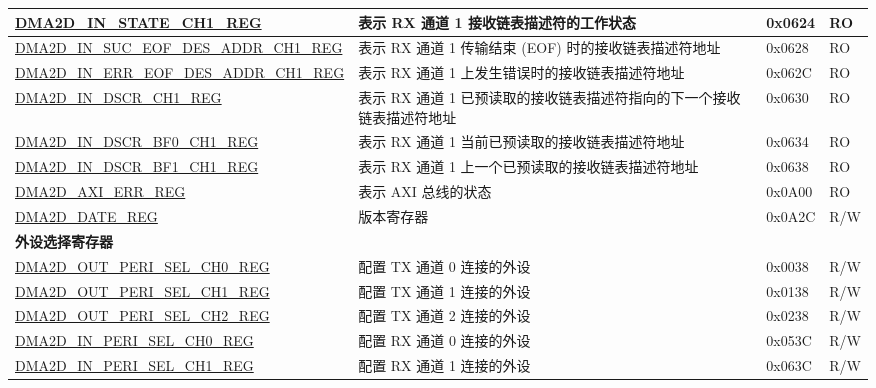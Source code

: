 \begin{longtable}{ | p{7cm} | p{11.5cm} | p{1.3cm} | p{2cm} | }
\hyperref[regdesc:DMA2DINSTATECHNREG]{DMA2D\_IN\_STATE\_CH1\_REG} & 表示 RX 通道 1 接收链表描述符的工作状态 & 0x0624 & RO \\ \hline
\hyperref[regdesc:DMA2DINSUCEOFDESADDRCHNREG]{DMA2D\_IN\_SUC\_EOF\_DES\_ADDR\_CH1\_REG} & 表示 RX 通道 1 传输结束 (EOF) 时的接收链表描述符地址 & 0x0628 & RO \\ \hline
\hyperref[regdesc:DMA2DINERREOFDESADDRCHNREG]{DMA2D\_IN\_ERR\_EOF\_DES\_ADDR\_CH1\_REG} & 表示 RX 通道 1 上发生错误时的接收链表描述符地址 & 0x062C & RO \\ \hline
\hyperref[regdesc:DMA2DINDSCRCHNREG]{DMA2D\_IN\_DSCR\_CH1\_REG} & 表示 RX 通道 1 已预读取的接收链表描述符指向的下一个接收链表描述符地址 & 0x0630 & RO \\ \hline
\hyperref[regdesc:DMA2DINDSCRBF0CHNREG]{DMA2D\_IN\_DSCR\_BF0\_CH1\_REG} & 表示 RX 通道 1 当前已预读取的接收链表描述符地址 & 0x0634 & RO \\ \hline
\hyperref[regdesc:DMA2DINDSCRBF1CHNREG]{DMA2D\_IN\_DSCR\_BF1\_CH1\_REG} & 表示 RX 通道 1 上一个已预读取的接收链表描述符地址 & 0x0638 & RO \\ \hline
\hyperref[regdesc:DMA2DAXIERRREG]{DMA2D\_AXI\_ERR\_REG} & 表示 AXI 总线的状态 & 0x0A00 & RO \\ \hline
\hyperref[regdesc:DMA2DDATEREG]{DMA2D\_DATE\_REG} & 版本寄存器 & 0x0A2C & R/W \\ \hline
\multicolumn{4}{|l|}{\textbf{外设选择寄存器}} \\ \hline
\hyperref[regdesc:DMA2DOUTPERISELCHNREG]{DMA2D\_OUT\_PERI\_SEL\_CH0\_REG} & 配置 TX 通道 0 连接的外设 & 0x0038 & R/W \\ \hline
\hyperref[regdesc:DMA2DOUTPERISELCHNREG]{DMA2D\_OUT\_PERI\_SEL\_CH1\_REG} & 配置 TX 通道 1 连接的外设 & 0x0138 & R/W \\ \hline
\hyperref[regdesc:DMA2DOUTPERISELCHNREG]{DMA2D\_OUT\_PERI\_SEL\_CH2\_REG} & 配置 TX 通道 2 连接的外设 & 0x0238 & R/W \\ \hline
\hyperref[regdesc:DMA2DINPERISELCHNREG]{DMA2D\_IN\_PERI\_SEL\_CH0\_REG} & 配置 RX 通道 0 连接的外设 & 0x053C & R/W \\ \hline
\hyperref[regdesc:DMA2DINPERISELCHNREG]{DMA2D\_IN\_PERI\_SEL\_CH1\_REG} & 配置 RX 通道 1 连接的外设 & 0x063C & R/W \\ \hline
\end{longtable}
